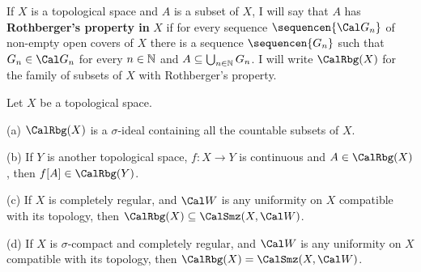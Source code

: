    If $X$ is a topological space and $A$ is a
subset of $X$, I will say that $A$ has {\bf Rothberger's property in}
$X$ if for every sequence
$\sequencen{\Cal G_n}$ of non-empty open covers of $X$ there is a
sequence $\sequencen{G_n}$ such that $G_n\in\Cal G_n$ for every
$n\in\Bbb N$ and $A\subseteq\bigcup_{n\in\Bbb N}G_n$.      I will write $\CalRbg(X)$ for the family
of subsets of $X$ with Rothberger's property.

 Let $X$ be a topological space.

(a) $\CalRbg(X)$ is
a $\sigma$-ideal containing all the countable subsets of $X$.

(b) If $Y$ is another topological space, $f:X\to Y$ is continuous and
$A\in\CalRbg(X)$, then $f[A]\in\CalRbg(Y)$.

(c) If $X$ is completely regular, and $\Cal W$ is any uniformity on
$X$ compatible with its topology, then
$\CalRbg(X)\subseteq\CalSmz(X,\Cal W)$.

(d) If $X$ is $\sigma$-compact and completely regular, and $\Cal W$ is
any uniformity on $X$ compatible with its topology, then
$\CalRbg(X)=\CalSmz(X,\Cal W)$.

